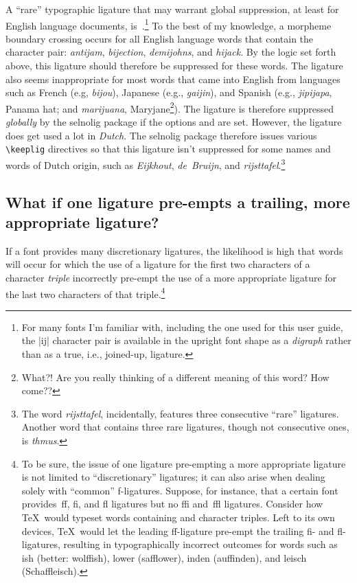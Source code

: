 \documentclass[11pt]{article}
\newcommand{\pkg}[1]{\textsf{#1}}
\newcommand{\opt}[1]{\uselig{\texttt{#1}}}
\newcommand{\cmmd}[1]{\texttt{\textbackslash #1}}
\begin{document}
A \enquote{rare} typographic ligature that may warrant global suppression, at least for English language documents, is~.\footnote{For many fonts I'm familiar with, including the one used for this user guide, the |ij| character pair is available in the upright font shape as a \emph{digraph} rather than as a true, i.e., joined-up, ligature.} To the best of my knowledge, a morpheme boundary crossing occurs for all English language words that contain the~\opt{ij} character pair: \emph{antijam}, \emph{bijection}, \emph{demijohns}, and \emph{hijack}. By the logic set forth above, this ligature should therefore be suppressed for these words. The  ligature also seems inappropriate for most words that came into English from languages such as French (e.g, \emph{bijou}), Japanese (e.g., \emph{gaijin}), and Spanish (e.g., \emph{jipijapa}, Panama hat; and \emph{marijuana},  Maryjane\footnote{What?! Are you really thinking of a different meaning of this word? How come??}). The  ligature is therefore suppressed \emph{globally} by the \pkg{selnolig} package if the options \opt{english} and \opt{hdlig} are set.
However, the \emph{} ligature does get used a lot in \emph{Dutch}. The \pkg{selnolig} package therefore issues various \cmmd{keeplig} directives so that this ligature isn't suppressed for some names and words of Dutch origin, such as \emph{Eijkhout}, \emph{de~Bruijn}, and \emph{rijsttafel}.\footnote{The word \emph{rijsttafel}, incidentally, features three consecutive \enquote{rare} ligatures. Another word that contains three rare ligatures, though not consecutive ones, is \emph{thmus}. }



\subsection{What if one ligature pre-empts a trailing, more appropriate ligature?} \label{sec:preempt}

If a font provides many discretionary ligatures, the likelihood is high that words will occur for which the use of a ligature for the first two characters of a character \emph{triple} incorrectly pre-empt the use of a more appropriate ligature for the last two characters of that triple.\footnote{To be sure, the issue of one ligature pre-empting a more appropriate ligature is not limited to \enquote{discretionary} ligatures; it can also arise when dealing solely with \enquote{common} f-ligatures. Suppose, for instance, that a certain font provides~ff, fi, and fl ligatures but no ffi and~ffl ligatures. Consider how \TeX\ would typeset words containing \opt{ffi} and \opt{ffl} character triples. Left to its own devices, \TeX\ would let the leading ff-ligature pre-empt the trailing fi- and fl-ligatures, resulting in typographically incorrect outcomes for words such as ish (better: wolffish), lower (safflower), inden (auffinden), and leisch (Schaffleisch).}
\end{document}
